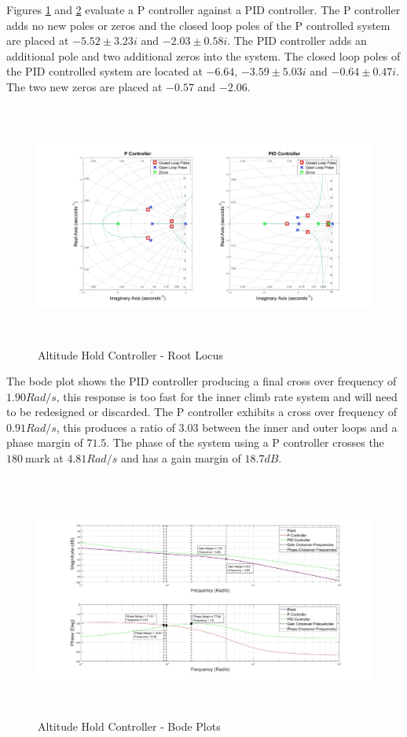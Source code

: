 	 Figures \ref{IM_AltHoldRoot} and \ref{IM_AltHoldBode} evaluate a P controller against a PID controller. The P controller adds no new poles or zeros and the closed loop poles of the P controlled system are placed at $-5.52 \pm 3.23i$ and $-2.03 \pm 0.58i$. 
	 The PID controller adds an additional pole and two additional zeros into the system. The closed loop poles of the PID controlled system are located at $-6.64$, $-3.59 \pm 5.03i$ and $-0.64 \pm 0.47i$. The two new zeros are placed at $-0.57$ and $-2.06$.
	 
	 \begin{figure}[H]
	 	\centering
	 	\includegraphics[height = 8cm]{../Design/Matlab/Controllers/altitude_root.jpg}
	 	\caption{Altitude Hold Controller -  Root Locus}
	 	\label{IM_AltHoldRoot}
	 \end{figure}
	 
	 The bode plot shows the PID controller producing a final cross over frequency of $1.90Rad/s$, this response is too fast for the inner climb rate system and will need to be redesigned or discarded. The P controller exhibits a cross over frequency of $0.91Rad/s$, this produces a ratio of $3.03$ between the inner and outer loops and a phase margin of $71.5$\textdegree. The phase of the system using a P controller crosses the $180$\textdegree  $\ $mark at $4.81Rad/s$ and has a gain margin of $18.7dB$.
	 
	 \begin{figure}[H]
	 	\centering
	 	\includegraphics[height = 8cm]{../Design/Matlab/Controllers/altitude_bode.jpg}
	 	\caption{Altitude Hold Controller -  Bode Plots}
	 	\label{IM_AltHoldBode}
	 \end{figure}
	 
